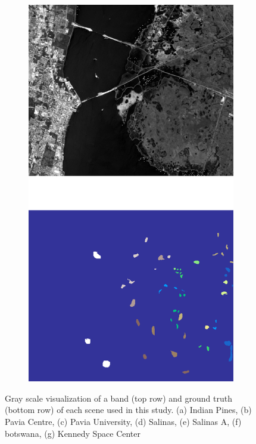 \documentclass[parskip=full]{scrartcl}
\begin{document}
\begin{figure}[H]
\begin{subfigure}{.24\textwidth}
		\includegraphics[height=1.9\linewidth]{../analysis/kennedy_space_center}
		\subcaption{{\medbreak}}
		\label{fig:kennedy_space_center}
	\end{subfigure}
	\caption{Gray scale visualization of a band (top row) and ground truth (bottom row) of
		each scene used in this study. (a) Indian Pines, (b) Pavia Centre, (c) Pavia
		University, (d) Salinas, (e) Salinas A, (f) botswana, (g) Kennedy Space Center}
	\label{fig:scenes}
\end{figure}
\end{document}

